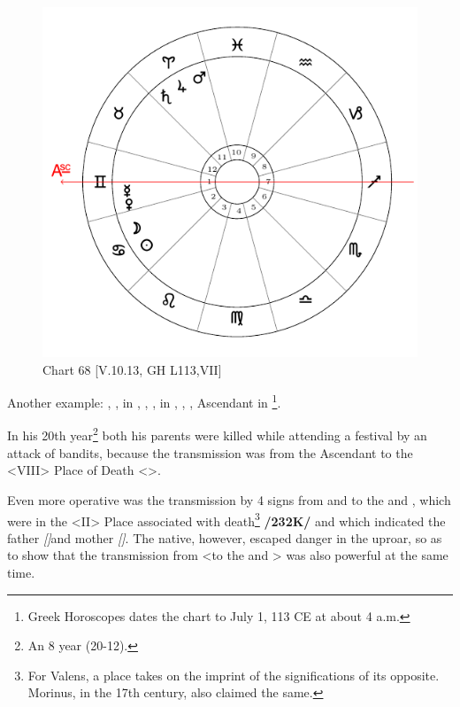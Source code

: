 \begin{figure}
\centering
\includegraphics[width=.68\textwidth]{charts/5_10_13}
\caption{Chart 68 [V.10.13, GH L113,VII]}
\label{fig:chart68}
\end{figure}

\newpage
\noindent Another example: \Sun, \Moon, in \Cancer, \Saturn, \Jupiter, \Mars\xspace in \Aries, \Venus, \Mercury, Ascendant in \Gemini\footnote{{Greek Horoscopes} dates the chart to July 1, 113 CE at about 4 a.m.}. 

In his 20th year\footnote{An 8 year (20-12).} both his parents were killed while attending a festival by an attack of bandits, because the transmission was from the Ascendant to the <VIII> Place of Death <\Capricorn>. 

Even more operative was the transmission by 4 signs from \Saturn\xspace and \Mars\xspace to the \Sun\xspace and \Moon, which were in the
<II> Place associated with death\footnote{For Valens, a place takes on the imprint of the significations of its opposite. Morinus, in the 17th century, also claimed the same.} \textbf{/232K/} and which indicated the father \textsl{[\Sun]}and mother \textsl{[\Moon]}. The native, however, escaped danger in the uproar, so as to show that the transmission from \Jupiter\xspace <to the \Sun\xspace and \Moon> was also powerful at the same time.
\newpage